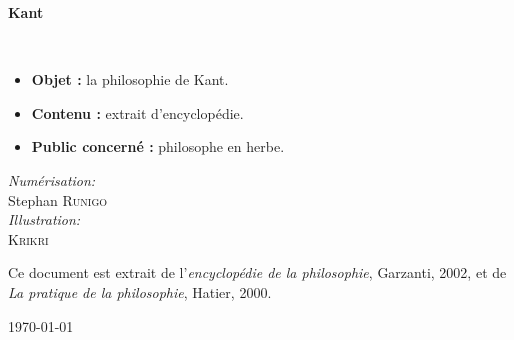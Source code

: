 \begin{titlepage}
\HRule

\begin{center}
{\huge \bfseries  Kant\\}
\end{center}

\HRule \\[1.5cm]

\vfill


\begin{minipage}{0.5\textwidth}
\begin{itemize}[leftmargin=1cm, label=, itemsep=2pt]
\item {\bf Objet : } la philosophie de Kant.
\item {\bf Contenu : } extrait d'encyclopédie.
\item {\bf Public concerné : } philosophe en herbe.
\end{itemize}
\end{minipage}
\hfill
\begin{minipage}{0.4\textwidth}
\begin{flushright}%
\emph{Numérisation:}\\
Stephan \textsc{Runigo}\\
\emph{Illustration:}\\
\textsc{Krikri}
\end{flushright}
\end{minipage}

\vfill

Ce document est extrait de l'{\it encyclopédie de la philosophie}, {\sc Garzanti}, 2002, et de {\it La pratique de la philosophie}, {\sc Hatier}, 2000.

\vfill

{\large \today}

\end{titlepage}
